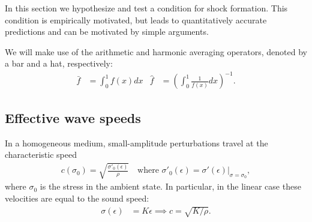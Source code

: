 In this section we hypothesize and test a condition for shock formation.
This condition is empirically motivated, but leads to quantitatively accurate
predictions and can be motivated by simple arguments.

We will make use of the arithmetic and harmonic averaging operators, 
denoted by a bar and a hat, respectively:
\begin{align*}
\bar{f} & = \int_0^1 f(x) dx & \hat{f} & = \left(\int_0^1 \frac{1}{f(x)} dx\right)^{-1}.
\end{align*}

\subsection{Effective wave speeds}
In a homogeneous medium, small-amplitude perturbations travel at the
characteristic speed
\begin{align*}
c(\sigma_0) = \sqrt{\frac{\sigma'_0(\epsilon)}{\rho}} \ \ \ 
\mbox{ where } \sigma'_0(\epsilon)=\left.\sigma'(\epsilon)\right|_{\sigma=\sigma_0},
\end{align*}
where $\sigma_0$ is the stress in the ambient state.
In particular, in the linear case
these velocities are equal to the sound speed:
\begin{align} \label{hom_sound_speed} 
\sigma(\epsilon) & = K \epsilon  \implies
c =  \sqrt{K/\rho}. \end{align}


